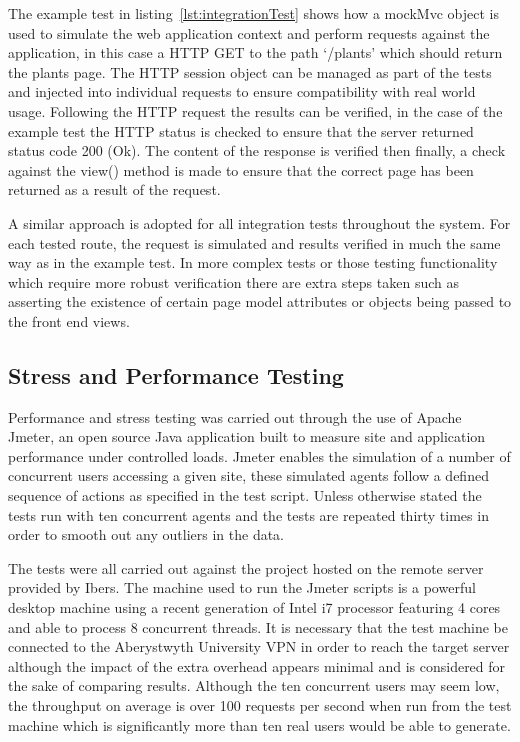  The example test in listing~\ref{lst:integrationTest} shows how a mockMvc object is used to simulate the web application context and perform requests against the application, in this case a HTTP GET to the path `/plants' which should return the plants page. The HTTP session object can be managed as part of the tests and injected into individual requests to ensure compatibility with real world usage. Following the HTTP request the results can be verified, in the case of the example test the HTTP status is checked to ensure that the server returned status code 200 (Ok). The content of the response is verified then finally, a check against the view() method is made to ensure that the correct page has been returned as a result of the request. 



A similar approach is adopted for all integration tests throughout the system. For each tested route, the request is simulated and results verified in much the same way as in the example test. In more complex tests or those testing functionality which require more robust verification there are extra steps taken such as asserting the existence of certain page model attributes or objects being passed to the front end views.


\subsection{Stress and Performance Testing}

Performance and stress testing was carried out through the use of Apache Jmeter\cite{_jmeter}, an open source Java application built to measure site and application performance under controlled loads. Jmeter enables the simulation of a number of concurrent users accessing a given site, these simulated agents follow a defined sequence of actions as specified in the test script. Unless otherwise stated the tests run with ten concurrent agents and the tests are repeated thirty times in order to smooth out any outliers in the data.

The tests were all carried out against the project hosted on the remote server provided by Ibers. The machine used to run the Jmeter scripts is a powerful desktop machine using a recent generation of Intel i7 processor featuring 4 cores and able to process 8 concurrent threads. It is necessary that the test machine be connected to the Aberystwyth University VPN in order to reach the target server although the impact of the extra overhead appears minimal and is considered for the sake of comparing results. Although the ten concurrent users may seem low, the throughput on average is over 100 requests per second when run from the test machine which is significantly more than ten real users would be able to generate.

